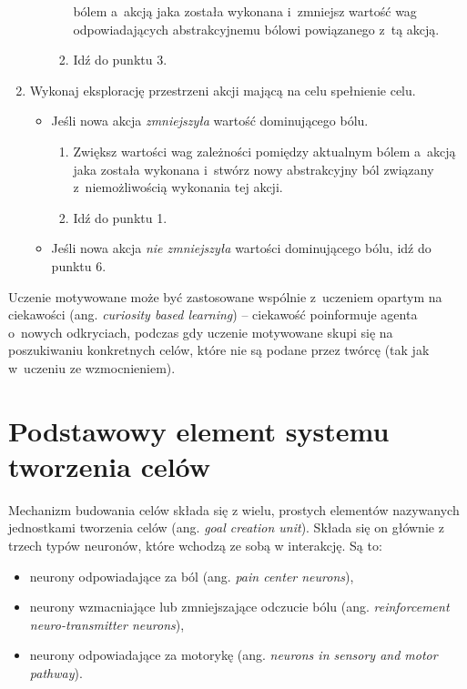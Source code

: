 \begin{enumerate}
\begin{itemize}
\begin{enumerate}
                        bólem a~akcją jaka została wykonana i~zmniejsz wartość 
                        wag odpowiadających abstrakcyjnemu bólowi powiązanego 
                        z~tą akcją.
                    \item Idź do punktu 3.
                \end{enumerate}
        \end{itemize}
    \item Wykonaj eksplorację przestrzeni akcji mającą na celu spełnienie celu.
        \begin{itemize}
            \item Jeśli nowa akcja \textit{zmniejszyła} wartość dominującego bólu.
                \begin{enumerate}
                    \item Zwiększ wartości wag zależności pomiędzy aktualnym 
                        bólem a~akcją jaka została wykonana i~stwórz nowy 
                        abstrakcyjny ból związany z~niemożliwością wykonania 
                        tej akcji.
                    \item Idź do punktu 1.
                \end{enumerate}
            \item Jeśli nowa akcja \textit{nie zmniejszyła} wartości 
                dominującego bólu, idź do punktu 6.
        \end{itemize}
\end{enumerate}

Uczenie motywowane może być zastosowane wspólnie z~uczeniem opartym na 
ciekawości (ang. \textit{curiosity based learning}) -- ciekawość poinformuje 
agenta o~nowych odkryciach, podczas gdy uczenie motywowane skupi się na 
poszukiwaniu konkretnych celów, które nie są podane przez twórcę (tak jak 
w~uczeniu ze wzmocnieniem).

\section{Podstawowy element systemu tworzenia celów}

Mechanizm budowania celów składa się z wielu, prostych elementów nazywanych 
jednostkami tworzenia celów (ang. \textit{goal creation unit}). Składa się on 
głównie z trzech typów neuronów, które wchodzą ze sobą w interakcję. Są to:

\begin{itemize}
	\item neurony odpowiadające za ból (ang. \textit{pain center neurons}),
	\item neurony wzmacniające lub zmniejszające odczucie bólu (ang. 
	\textit{reinforcement neuro-transmitter neurons}),
	\item neurony odpowiadające za motorykę (ang. \textit{neurons in sensory 
	and motor pathway}).
\end{itemize}

